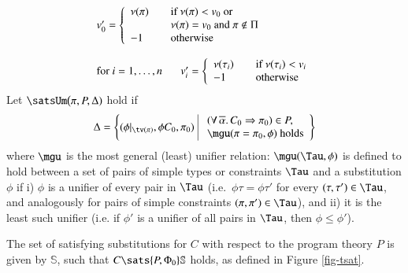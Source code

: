 \documentclass[review]{elsarticle}
\begin{document}
\[ \begin{array}{l}
   v'_0 = \left\{ \begin{array}{lll}
                \nu(\pi) & & \text{if } \nu(\pi) < v_0 \text{ or} \\
                          & & \nu(\pi) = v_0 \text{ and } \pi \not\in \Pi \\
                -1        & & \text{otherwise}
              \end{array} \right. \\ \\
   \text{for $i=1,\ldots,n$ }
   \hspace{.5cm} v'_i = \left\{ \begin{array}{lll}
                                           \nu(\tau_i) & & \text{if } \nu(\tau_i) < v_i \\
                                           -1           & & \text{otherwise}
                                        \end{array} \right. \\
   \end{array}
\]
Let $\satsUm\bigl(\pi,P,\Delta)$ hold if
\[ \Delta = \left\{ (\phi|_{\tv(\pi)},\phi C_0,\pi_0)\,\,
					\begin{array}{|l}
	                  \,\,(\forall\,\overline{\alpha}.\,C_0 \Rightarrow \pi_0) \in P,\\
                  		\,\,\mgu(\pi = \pi_0,\phi) \text{ holds}
                  	\end{array} \right\}
  \]
where $\mgu$ is the most general (least) unifier
relation\cite{Robinson65}: $\mgu(\Tau,\phi)$ is defined to hold
between a set of pairs of simple types or constraints $\Tau$ and a
substitution $\phi$ if i) $\phi$ is a unifier of every pair in $\Tau$
(i.e.~$\phi \tau = \phi\tau'$ for every $(\tau,\tau')\in \Tau$, and
analogously for pairs of simple constraints $(\pi,\pi')\in \Tau$), and
ii) it is the least such unifier (i.e. if $\phi'$ is a unifier of all
pairs in $\Tau$, then $\phi\leq \phi'$).

The set of satisfying substitutions for $C$ with respect to the
program theory $P$ is given by $\mathbb{S}$, such that $C \sats
{P,\Phi_0} \mathbb{S}$ holds, as defined in Figure \ref{fig-tsat}.
\end{document}
